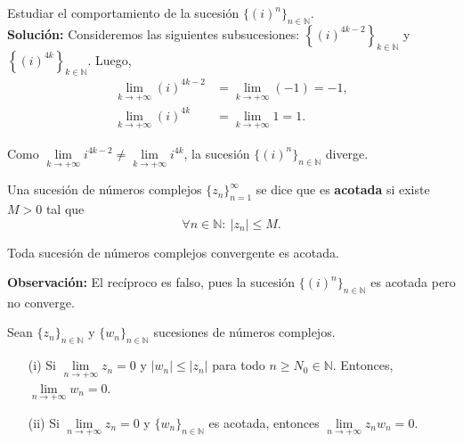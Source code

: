 \begin{ejemplo}
Estudiar el comportamiento de la sucesión $\{(i)^n\}_{n \in \mathbb{N}}$.
\\

\textbf{Solución:} Consideremos las siguientes subsucesiones: $\left\{ (i)^{4k-2}\right\}_{k \in \mathbb{N}}$ y $\left\{ (i)^{4k}\right\}_{k \in \mathbb{N}}$. Luego,
\begin{align*}
    \lim_{k \to + \infty} (i)^{4k-2} &= \lim_{k \to + \infty} (-1) = -1, \\
    \lim_{k \to + \infty} (i)^{4k} &= \lim_{k \to + \infty} 1 = 1.
\end{align*}

Como $\lim\limits_{k \to + \infty} i^{4k-2} \neq \lim\limits_{k \to + \infty} i^{4k}$, la sucesión $\{(i)^n\}_{n \in \mathbb{N}}$ diverge.
\end{ejemplo}

\begin{defi}
Una sucesión de números complejos $\{z_n\}_{n=1}^{\infty}$ se dice que es \textbf{acotada} si existe $M > 0$ tal que 
$$\forall n \in \mathbb{N}: ~ |z_n| \leq M.$$
\end{defi}

\begin{teorema}
Toda sucesión de números complejos convergente es acotada.
\end{teorema}

\textbf{Observación:} El recíproco es falso, pues la sucesión $\{(i)^n\}_{n \in \mathbb{N}}$ es acotada pero no converge.

\begin{teorema}
Sean $\{z_n\}_{n\in \mathbb{N}}$ y $\{w_n\}_{n\in \mathbb{N}}$  sucesiones de números complejos.
\begin{itemize}
    \item[(i)] Si $\lim\limits_{n\to + \infty} z_n = 0$ y $|w_n| \leq |z_n|$ para todo $n \geq N_0 \in \mathbb{N}$. Entonces, $\lim\limits_{n\to + \infty} w_n = 0$.
    
    \item[(ii)] Si  $\lim\limits_{n\to + \infty} z_n = 0$ y $\{w_n\}_{n\in \mathbb{N}}$ es acotada, entonces  $\lim\limits_{n\to + \infty} z_n w_n = 0$.
\end{itemize}
\end{teorema}

